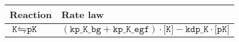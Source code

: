 \begin{tabular}{ll}
\textbf{Reaction} & \textbf{Rate law} \\
\midrule
$ \texttt{K}  \leftrightharpoons  \texttt{pK}  $ & $( \texttt{kp\_K\_bg}  +  \texttt{kp\_K\_egf}  ) \cdot  \texttt{[K]}  -  \texttt{kdp\_K}  \cdot  \texttt{[pK]}  $ \\
\end{tabular}